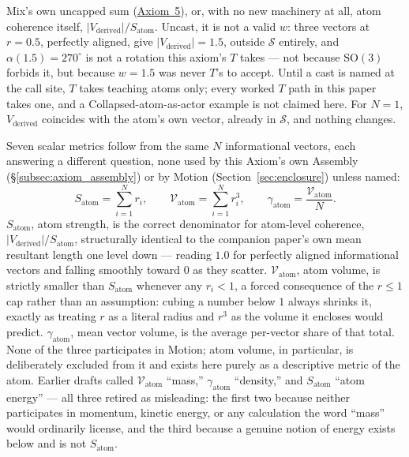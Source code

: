 \documentclass[12pt, a4paper]{article}
\begin{document}
Mix's own uncapped sum (\hyperref[subsec:axiom_interference]{Axiom~5}), or,
with no new machinery at all, atom coherence itself, $\lvert
V_{\text{derived}}\rvert/S_{\text{atom}}$. Uncast, it is not a valid
$w$: three vectors at $r=0.5$, perfectly aligned, give $\lvert
V_{\text{derived}}\rvert=1.5$, outside $\mathcal{S}$ entirely, and
$\alpha(1.5)=270^\circ$ is not a rotation this axiom's $T$ takes ---
not because $\mathrm{SO}(3)$ forbids it, but because $w=1.5$ was
never $T$'s to accept. Until a cast is named at the call site, $T$
takes teaching atoms only; every worked $T$ path in this paper takes
one, and a Collapsed-atom-as-actor example is not claimed here. For $N=1$,
$V_{\text{derived}}$ coincides with the atom's own vector, already
in $\mathcal{S}$, and nothing changes.

Seven scalar metrics follow from the same $N$ informational vectors,
each answering a different question, none used by this Axiom's own
Assembly (\S\ref{subsec:axiom_assembly}) or by Motion
(Section~\ref{sec:enclosure}) unless named:
\[
S_{\text{atom}} = \sum_{i=1}^N r_i, \qquad
\mathcal{V}_{\text{atom}} = \sum_{i=1}^N r_i^3, \qquad
\gamma_{\text{atom}} = \frac{\mathcal{V}_{\text{atom}}}{N}.
\]
$S_{\text{atom}}$, atom strength, is the correct denominator for
atom-level coherence, $\lvert V_{\text{derived}}\rvert /
S_{\text{atom}}$, structurally identical to the companion paper's own
mean resultant length one level down --- reading $1.0$ for perfectly
aligned informational vectors and falling smoothly toward $0$ as they
scatter. $\mathcal{V}_{\text{atom}}$, atom volume, is strictly
smaller than $S_{\text{atom}}$ whenever any $r_i<1$, a forced
consequence of the $r\le 1$ cap rather than an assumption: cubing a
number below $1$ always shrinks it, exactly as treating $r$ as a
literal radius and $r^3$ as the volume it encloses would predict.
$\gamma_{\text{atom}}$, mean vector volume, is the average per-vector
share of that total. None of the three participates in Motion; atom
volume, in particular, is deliberately excluded from it and exists
here purely as a descriptive metric of the atom. Earlier drafts
called $\mathcal{V}_{\text{atom}}$ ``mass,'' $\gamma_{\text{atom}}$
``density,'' and $S_{\text{atom}}$ ``atom energy'' --- all three
retired as misleading: the first two because neither participates in
momentum, kinetic energy, or any calculation the word ``mass'' would
ordinarily license, and the third because a genuine notion of energy
exists below and is not $S_{\text{atom}}$.
\end{document}
